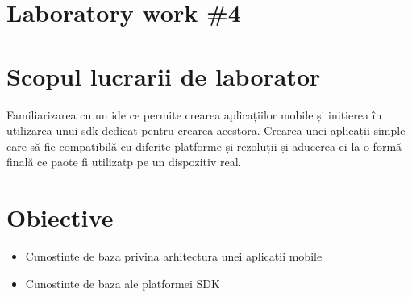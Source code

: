 \section*{Laboratory work \#4}

\section{Scopul lucrarii de laborator}
Familiarizarea cu un ide ce permite crearea aplicațiilor mobile și inițierea în utilizarea unui sdk dedicat pentru crearea acestora. Crearea unei aplicații simple care să fie compatibilă cu diferite platforme și rezoluții și aducerea ei la o formă finală ce paote fi utilizatp pe un dispozitiv real.
\section{Obiective}

\begin{itemize}
		\item Cunostinte de baza privina arhitectura unei aplicatii mobile
		\item Cunostinte de baza ale platformei SDK
	\end{itemize}

\clearpage